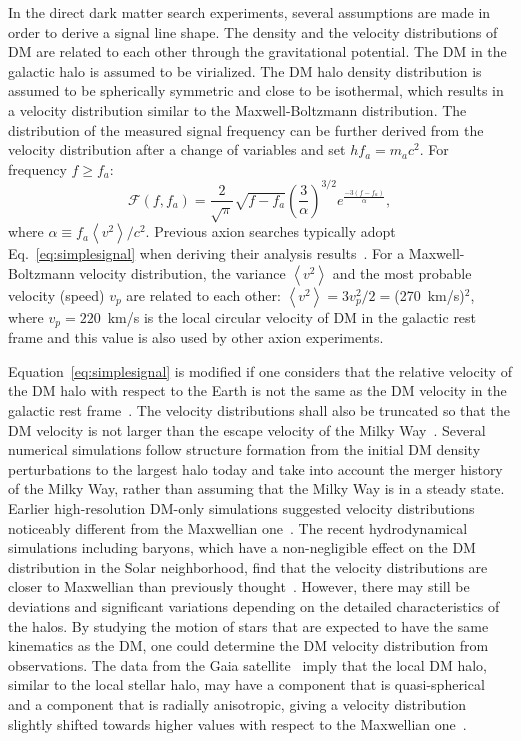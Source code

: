 \documentclass[%
reprint, %
superscriptaddress,
 amsmath,amssymb,
 aps
]{revtex4-2}
\begin{document}
In the direct dark matter search experiments, several assumptions are 
made in order to derive a signal line shape. 
The density and the velocity distributions of DM are related to each other 
through the gravitational potential. The DM in the galactic halo is assumed 
to be virialized. The DM halo density distribution is assumed 
to be spherically symmetric and close to be isothermal, which results in a 
velocity distribution similar to the Maxwell-Boltzmann distribution. The 
distribution of the measured signal frequency can be further derived from the 
velocity distribution after a change of variables and set 
\(hf_a = m_a c^2\). 
For frequency $f\ge f_a$:
\begin{equation}
\mathcal{F}(f, f_a) = \frac{2}{\sqrt{\pi}}\sqrt{f-f_a}\left(\frac{3}{\alpha}\right)^{3/2}
e^{\frac{-3\left(f-f_a\right)}{\alpha}}, 
\label{eq:simplesignal}
\end{equation}
where $\alpha\equiv  f_a \left<v^2\right>/c^2$. Previous axion searches 
typically adopt Eq.~\eqref{eq:simplesignal} when deriving their analysis 
results~\cite{HAYSTACII}. For a Maxwell-Boltzmann velocity 
distribution, the variance $\left<v^2\right>$ and the most probable velocity 
(speed) $v_p$ are related to each other:
$\left<v^2\right>=3v_p^2/2=$(270~km/s)$^2$, where $v_p=220$~km/s is the local 
circular velocity of DM in the galactic rest frame and this value is also 
used by other axion experiments. 

Equation~\eqref{eq:simplesignal} 
is modified if one considers that the relative velocity of the DM halo with 
respect to the Earth is not the same as the DM velocity in the galactic rest 
frame~\cite{SignalLineShapeI}. The velocity distributions shall also be 
truncated so that the DM velocity is not larger than the escape velocity of 
the Milky Way~\cite{Lisanti:2016jxe}. 
Several numerical simulations follow structure formation from the initial DM 
density perturbations to the largest halo today and take into account the 
merger history of the Milky Way, rather than assuming that the Milky Way is 
in a steady state. 
Earlier high-resolution DM-only simulations suggested velocity distributions 
noticeably different from the Maxwellian 
one~\cite{PDG,Lisanti:2016jxe,Green:2017odb}. 
The recent hydrodynamical simulations including baryons, which have a 
non-negligible effect on the DM distribution in the Solar neighborhood, find 
that the velocity distributions are closer to Maxwellian than previously 
thought~\cite{PDG,Green:2017odb}. However, there may still be deviations and 
significant variations depending on the detailed characteristics of the halos.
 By studying the motion of stars that are expected to have the same kinematics 
as the DM, one could determine the DM velocity distribution from observations. 
The data from the Gaia satellite~\cite{GAIA} imply that the local DM halo, 
similar to the local stellar halo, may have a component that is quasi-spherical
 and a component that is radially anisotropic, giving a velocity distribution 
slightly shifted towards higher values with respect to the Maxwellian 
one~\cite{Evans:2018bqy}.  
\end{document}
